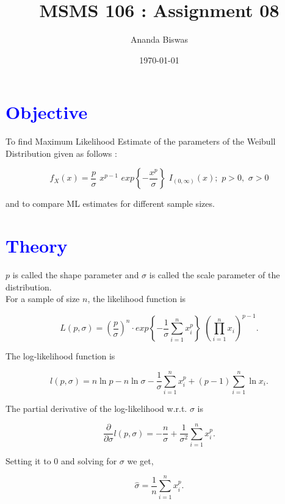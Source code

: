 \documentclass[11pt, a4paper]{article}\usepackage[]{graphicx}\usepackage[]{xcolor}
\title{MSMS 106 : Assignment 08}
\author{Ananda Biswas}
\date{\today}
\begin{document}
\maketitle


\section*{\faArrowAltCircleRight[regular] \textcolor{blue}{Objective}}

\hspace{1cm} To find Maximum Likelihood Estimate of the parameters of the Weibull Distribution given as follows :

$$f_X (x) = \dfrac{p}{\sigma} \,\, x^{p - 1} \,\, exp\left\{-\dfrac{x^p}{\sigma}\right\} \,\, I_{(0, \infty)}(x); \,\, p > 0, \,\, \sigma > 0 $$

and to compare ML estimates for different sample sizes. 



\section*{\faArrowAltCircleRight[regular] \textcolor{blue}{Theory}}

$p$ is called the shape parameter and $\sigma$ is called the scale parameter of the distribution. \\

For a sample of size $n$, the likelihood function is 

$$L(p, \sigma) = \left( \dfrac{p}{\sigma} \right)^{n} \cdot exp \left\{-\dfrac{1}{\sigma}\sum \limits_{i = 1}^{n} x_i^p \right\} \,\, \left( \prod \limits_{i = 1}^{n} x_i \right)^{p - 1}. $$


The log-likelihood function is 

$$ l(p, \sigma) = n \ln p - n \ln \sigma - \dfrac{1}{\sigma}\sum \limits_{i = 1}^{n} x_i^p + ({p - 1}) \sum \limits_{i = 1}^{n} \ln x_i .$$

The partial derivative of the log-likelihood w.r.t. $\sigma$ is

$$ \dfrac{\partial}{\partial \sigma} l(p, \sigma) = - \dfrac{n}{\sigma} + \dfrac{1}{\sigma^2}\sum \limits_{i = 1}^{n} x_i^p . $$

Setting it to $0$ and solving for $\sigma$ we get,

\begin{equation}
\hat{\sigma} =  \dfrac{1}{n}\sum \limits_{i = 1}^{n} x_i^p.
\end{equation}
\end{document}
